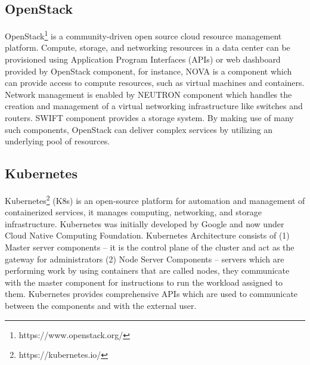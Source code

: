 \subsection{OpenStack}
\label{SecOpenStack}
OpenStack\footnote{https://www.openstack.org/} is a community-driven open source cloud resource management platform. Compute, storage, and networking resources in a data center can be provisioned using Application Program Interfaces (APIs) or web dashboard provided by OpenStack component, for instance, NOVA is a component which can provide access to compute resources, such as virtual machines and containers. Network management is enabled by NEUTRON component which handles the creation and management of a virtual networking infrastructure like switches and routers. SWIFT component provides a storage system. By making use of many such components, OpenStack can deliver complex services by utilizing an underlying pool of resources.

\subsection{Kubernetes}
\label{SecKubernetes}
Kubernetes\footnote{https://kubernetes.io/} (K8s) is an open-source platform for automation and management of containerized services, it manages computing, networking, and storage infrastructure. Kubernetes was initially developed by Google and now under Cloud Native Computing Foundation. Kubernetes Architecture consists of (1) Master server components -- it is the control plane of the cluster and act as the gateway for  administrators (2) Node Server Components -- servers which are performing work by using containers that are called nodes, they communicate with the master component for instructions to run the workload assigned to them. Kubernetes provides comprehensive APIs which are used to communicate between the components and with the external user.
